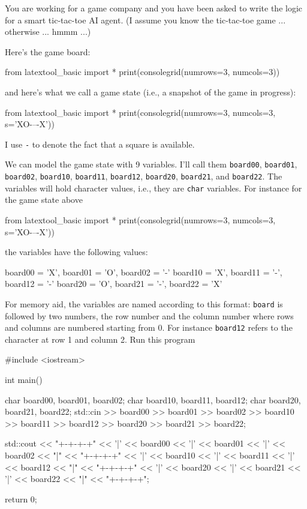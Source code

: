 You are working for a 
game company and you have
been asked to 
write the logic for a smart tic-tac-toe AI agent.
(I assume you know the tic-tac-toe game ... 
otherwise ... hmmm ...)

Here's the game board:
\begin{python}
from latextool_basic import *
print(consolegrid(numrows=3, numcols=3))
\end{python}
and here's what we call a game state (i.e., a snapshot 
of the game in progress):
\begin{python}
from latextool_basic import *
print(consolegrid(numrows=3, numcols=3, s='XO-\nX--\nO-X'))
\end{python}
I use \verb!-! to denote the fact that a square is available.

We can model the game state with 9 variables.
I'll call them 
\verb!board00!,
\verb!board01!,
\verb!board02!,
\verb!board10!,
\verb!board11!,
\verb!board12!,
\verb!board20!,
\verb!board21!, and
\verb!board22!.
The variables will hold character values, i.e., they are \verb!char!
variables.
For instance for the game state above
\begin{python}
from latextool_basic import *
print(consolegrid(numrows=3, numcols=3, s='XO-\nX--\nO-X'))
\end{python}
the variables have the following values:
\begin{console}[frame=none]

        board00 = 'X',  board01 = 'O',  board02 = '-'
        board10 = 'X',  board11 = '-',  board12 = '-'
        board20 = 'O',  board21 = '-',  board22 = 'X'

\end{console}
For memory aid, the variables are named according to this
format: \verb!board! is followed by two numbers, the row number and the
column number where rows and columns are numbered starting from 0.
For instance \verb!board12! refers to the character at row 1 and column 2.
Run this program
\begin{console}[fontsize=\small]
#include <iostream>

int main()
{
    char board00, board01, board02;
    char board10, board11, board12;
    char board20, board21, board22;
    std::cin >> board00 >> board01 >> board02
             >> board10 >> board11 >> board12
             >> board20 >> board21 >> board22;

    std::cout << "+-+-+-+\n"
              << '|' << board00 << '|' << board01 << '|' << board02 << "|\n"
              << "+-+-+-+\n"
              << '|' << board10 << '|' << board11 << '|' << board12 << "|\n"
              << "+-+-+-+\n"
              << '|' << board20 << '|' << board21 << '|' << board22 << "|\n"
              << "+-+-+-+\n";

    return 0;
}
\end{console}
